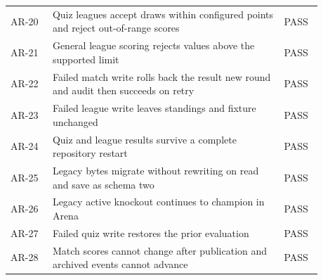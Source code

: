 \begin{longtable}{p{0.12\linewidth}p{0.66\linewidth}p{0.1\linewidth}}
AR-20 & Quiz leagues accept draws within configured points and reject out-of-range scores & PASS\\
AR-21 & General league scoring rejects values above the supported limit & PASS\\
AR-22 & Failed match write rolls back the result new round and audit then succeeds on retry & PASS\\
AR-23 & Failed league write leaves standings and fixture unchanged & PASS\\
AR-24 & Quiz and league results survive a complete repository restart & PASS\\
AR-25 & Legacy bytes migrate without rewriting on read and save as schema two & PASS\\
AR-26 & Legacy active knockout continues to champion in Arena & PASS\\
AR-27 & Failed quiz write restores the prior evaluation & PASS\\
AR-28 & Match scores cannot change after publication and archived events cannot advance & PASS\\
\bottomrule\end{longtable}\normalsize
